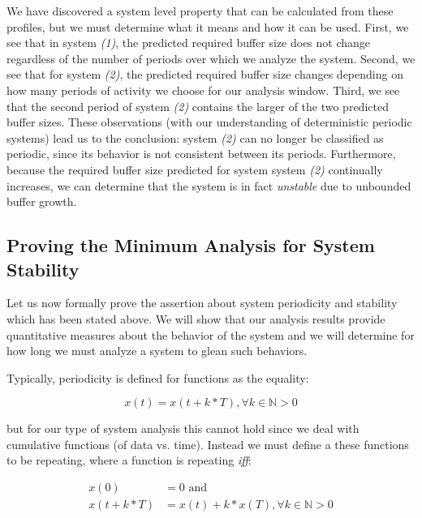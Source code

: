 We have discovered a system level property that can be calculated from
these profiles, but we must determine what it means and how it can be
used.  First, we see that in system \emph{(1)}, the predicted required
buffer size does not change regardless of the number of periods over
which we analyze the system.  Second, we see that for system \emph{(2)},
the predicted required buffer size changes depending on how many
periods of activity we choose for our analysis window.  Third, we see
that the second period of system \emph{(2)} contains the larger of the two
predicted buffer sizes.  These observations (with our understanding of
deterministic periodic systems) lead us to the conclusion: system
\emph{(2)} can no longer be classified as periodic, since its behavior is
not consistent between its periods.  Furthermore, because the required
buffer size predicted for system system \emph{(2)} continually increases,
we can determine that the system is in fact \emph{unstable} due to
unbounded buffer growth.

\subsection{Proving the Minimum Analysis for System Stability}
\label{subsec:periodic_proof}

Let us now formally prove the assertion about system periodicity and
stability which has been stated above.  We will show that our analysis
results provide quantitative measures about the behavior of the system
and we will determine for how long we must analyze a system to glean
such behaviors.

Typically, periodicity is defined for functions as the equality:

\begin{equation}
  x(t) = x(t + k * T), \forall k \in \mathbb{N} > 0
\end{equation}

but for our type of system analysis this cannot hold since we deal
with cumulative functions (of data vs. time).  Instead we must define
a these functions to be repeating, where a function is repeating
\emph{iff}:

\begin{equation}
  \begin{split}
    x(0) &= 0 \text{  and}\\
    x(t + k * T) &= x(t) + k * x(T), \forall k \in \mathbb{N} > 0
  \end{split}
\end{equation}

